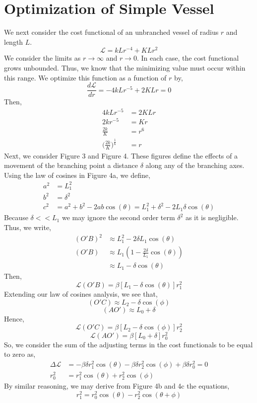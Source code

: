 \documentclass[letterpaper,10pt]{article}
\newcommand{\eL}{\mathcal{L}}
\begin{document}
\section*{Optimization of Simple Vessel}
We next consider the cost functional of an unbranched vessel of radius $r$ and length $L$.
\[\eL=kLr^{-4}+KLr^2\]
We consider the limits as $r\to \infty$ and $r\to 0$. In each case, the cost functional grows unbounded. Thus, we know that the minimizing value must occur within this range. We optimize this function as a function of $r$ by,
\[\frac{d\eL}{dr}=-4kLr^{-5}+2KLr=0\]
Then,
\begin{align*}
4kLr^{-5} &= 2KLr\\
2kr^{-5} &= Kr\\
\frac{2k}{K} &= r^6\\
\bigg(\frac{2k}{K}\bigg)^{\frac{1}{6}} &= r
\end{align*}
Next, we consider Figure 3 and Figure 4. These figures define the effects of a movement of the branching point a distance $\delta$ along any of the branching axes. Using the law of cosines in Figure 4a, we define,
\begin{align*}
a^2&=L_1^2\\
b^2&=\delta^2\\
c^2&=a^2+b^2-2ab\cos(\theta)=L_1^2+\delta^2-2L_1\delta\cos(\theta)
\end{align*}
Because $\delta<<L_1$ we may ignore the second order term $\delta^2$ as it is negligible. Thus, we write,
\begin{align*}
(O'B)^2 &\approx L_1^2-2\delta L_1\cos(\theta)\\
(O'B) &\approx L_1(1-\frac{2\delta}{L_1}\cos(\theta))\\
&\approx L_1-\delta\cos(\theta)
\end{align*}
Then,
\[\eL(O'B)=\beta[L_1-\delta\cos(\theta)]r_1^2\]
Extending our law of cosines analysis, we see that,
\[(O'C) \approx L_2-\delta\cos(\phi)\]
\[(AO') \approx L_0+\delta\]
Hence,
\[\eL(O'C)=\beta[L_2-\delta\cos(\phi)]r_2^2\]
\[\eL(AO')=\beta[L_0+\delta]r_0^2\]
So, we consider the sum of the adjusting terms in the cost functionals to be equal to zero as,
\begin{align*}
\Delta\eL &= -\beta\delta r_1^2\cos(\theta)-\beta\delta r_2^2 \cos(\phi)+\beta\delta r_0^2 = 0\\
r_0^2 &= r_1^2\cos(\theta) + r_2^2\cos(\phi)
\end{align*}
By similar reasoning, we may derive from Figure 4b and 4c the equations,
\[r_1^2=r_0^2\cos(\theta)-r_2^2\cos(\theta+\phi)\]
\end{document}
